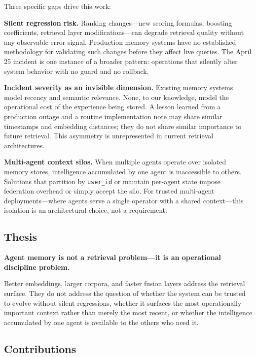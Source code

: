Three specific gaps drive this work:

\textbf{Silent regression risk.} Ranking changes---new scoring formulas, boosting
coefficients, retrieval layer modifications---can degrade retrieval quality without any
observable error signal. Production memory systems have no established methodology for
validating such changes before they affect live queries. The April 25 incident is one
instance of a broader pattern: operations that silently alter system behavior with no guard
and no rollback.

\textbf{Incident severity as an invisible dimension.} Existing memory systems model recency
and semantic relevance. None, to our knowledge, model the operational cost of the
experience being stored. A lesson learned from a production outage and a routine
implementation note may share similar timestamps and embedding distances; they do not share
similar importance to future retrieval. This asymmetry is unrepresented in current
retrieval architectures.

\textbf{Multi-agent context silos.} When multiple agents operate over isolated memory
stores, intelligence accumulated by one agent is inaccessible to others. Solutions that
partition by \texttt{user\_id} \cite{chhikara2025mem0} or maintain per-agent state
\cite{packer2023memgpt} impose federation overhead or simply accept the silo. For trusted
multi-agent deployments---where agents serve a single operator with a shared context---this
isolation is an architectural choice, not a requirement.

\subsection{Thesis}

\textbf{Agent memory is not a retrieval problem---it is an operational discipline problem.}

Better embeddings, larger corpora, and faster fusion layers address the retrieval surface.
They do not address the question of whether the system can be trusted to evolve without
silent regressions, whether it surfaces the most operationally important context rather
than merely the most recent, or whether the intelligence accumulated by one agent is
available to the others who need it.

\subsection{Contributions}

